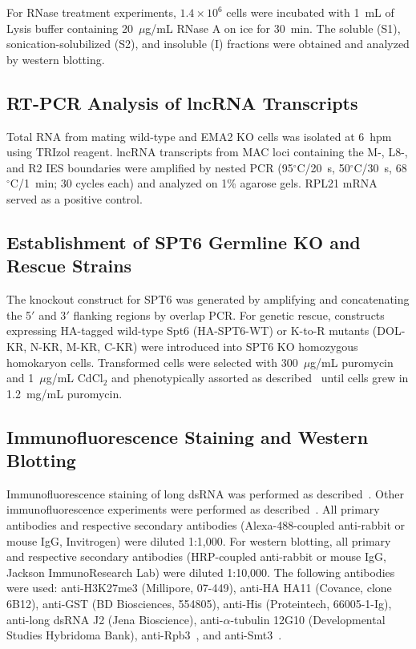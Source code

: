 \documentclass[12pt]{article}
\begin{document}
For RNase treatment experiments, $1.4 \times 10^{6}$ cells were incubated with 1~mL of Lysis buffer containing 20~$\mu$g/mL RNase A on ice for 30~min.
The soluble (S1), sonication-solubilized (S2), and insoluble (I) fractions were obtained and analyzed by western blotting.

\subsection{RT-PCR Analysis of lncRNA Transcripts}

Total RNA from mating wild-type and EMA2 KO cells was isolated at 6~hpm using TRIzol reagent.
lncRNA transcripts from MAC loci containing the M-, L8-, and R2 IES boundaries were amplified by nested PCR (95$^{\circ}$C/20~s, 50$^{\circ}$C/30~s, 68$^{\circ}$C/1~min; 30 cycles each) and analyzed on 1\% agarose gels.
RPL21 mRNA served as a positive control.

\subsection{Establishment of SPT6 Germline KO and Rescue Strains}

The knockout construct for SPT6 was generated by amplifying and concatenating the 5$'$ and 3$'$ flanking regions by overlap PCR.
For genetic rescue, constructs expressing HA-tagged wild-type Spt6 (HA-SPT6-WT) or K-to-R mutants (DOL-KR, N-KR, M-KR, C-KR) were introduced into SPT6 KO homozygous homokaryon cells.
Transformed cells were selected with 300~$\mu$g/mL puromycin and 1~$\mu$g/mL CdCl$_{2}$ and phenotypically assorted as described~\citep{Hamilton2000} until cells grew in 1.2~mg/mL puromycin.

\subsection{Immunofluorescence Staining and Western Blotting}

Immunofluorescence staining of long dsRNA was performed as described~\citep{Woo2016}.
Other immunofluorescence experiments were performed as described~\citep{Loidl2004}.
All primary antibodies and respective secondary antibodies (Alexa-488-coupled anti-rabbit or mouse IgG, Invitrogen) were diluted 1:1,000.
For western blotting, all primary and respective secondary antibodies (HRP-coupled anti-rabbit or mouse IgG, Jackson ImmunoResearch Lab) were diluted 1:10,000.
The following antibodies were used: anti-H3K27me3 (Millipore, 07-449), anti-HA HA11 (Covance, clone 6B12), anti-GST (BD Biosciences, 554805), anti-His (Proteintech, 66005-1-Ig), anti-long dsRNA J2 (Jena Bioscience), anti-$\alpha$-tubulin 12G10 (Developmental Studies Hybridoma Bank), anti-Rpb3~\citep{Kataoka2017}, and anti-Smt3~\citep{Nasir2015}.
\end{document}
